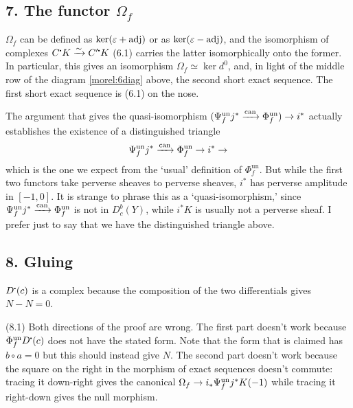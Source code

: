 \documentclass[deligne.tex]{subfiles}
\begin{document}
\subsection*{7. The functor $\Omega_f$}
$\Omega_f$ can be defined as $\ker(\varepsilon+\operatorname{adj})$ or as $\ker(\varepsilon-\operatorname{adj})$,
and the isomorphism of complexes $C^\dotp K\xra\sim C'^\dotp K$ (6.1)
carries the latter isomorphically onto the former.
In particular, this gives an isomorphism $\Omega_f\simeq\ker d^0$, and, in
light of the middle row of the diagram \eqref{morel:6diag} above, the
second short exact sequence. The first short exact sequence is (6.1) on the 
nose.

The argument that gives the quasi-isomorphism
$(\Psi_f^{\mathrm{un}}j^*\xrightarrow{\operatorname{can}}\Phi_f^{\mathrm{un}})\rightarrow i^*$
actually establishes the existence of a distinguished triangle
\begin{equation*}
	\Psi_f^{\mathrm{un}}j^*\xrightarrow{\operatorname{can}}\Phi_f^{\mathrm{un}}\rightarrow i^*\rightarrow
\end{equation*}
which is the one we expect from the `usual' definition of
$\Phi_f^{\mathrm{un}}$. But while the first two functors take perverse 
sheaves to perverse sheaves, $i^*$ has perverse amplitude in $[-1,0]$.
It is strange to phrase this as a `quasi-isomorphism,' since
$\Psi_f^{\mathrm{un}}j^*\xrightarrow{\operatorname{can}}\Phi_f^{\mathrm{un}}$ is not in
$D^b_c(Y)$, while $i^*K$ is usually not a perverse sheaf.
I prefer just to say that we have the distinguished triangle above.

\subsection*{8. Gluing}
$D^\dotp (c)$ is a complex because the composition of the two differentials
gives $N-N=0$.

(8.1) Both directions of the proof are wrong. The first part doesn't work
because $\Phi_f^{\mathrm{un}}D^\dotp(c)$ does not have the stated form.
Note that the form that is claimed has $b\circ a=0$ but this should instead
give $N$. The second part doesn't work because the square on the right in
the morphism of exact sequences doesn't commute: tracing it down-right
gives the canonical $\Omega_f\rightarrow i_*\Psi_f^{\mathrm{un}}j^*K(-1)$ while
tracing it right-down gives the null morphism.
\end{document}
